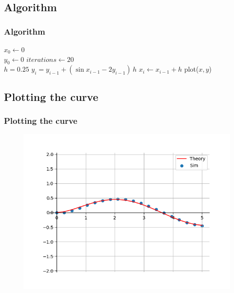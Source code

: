 \documentclass{beamer}
\providecommand{\brak}[1]{\ensuremath{\left(#1\right)}}
\theoremstyle{remark}
\numberwithin{equation}{section}
\begin{document}
\subsection{Algorithm}
\begin{frame}
    \frametitle{Algorithm}
        \begin{algorithmic}
            \STATE {} $x_0 \gets 0$\\
            \STATE $y_0 \gets 0$
            \STATE {} $iterations \gets 20$\\
            \STATE {} $h = 0.25$
                \STATE $\displaystyle y_{i} = y_{i-1} + \brak{\sin{x_{i-1}} - 2y_{i-1}}\, h$
                \STATE $x_i \gets x_{i-1} + h$
            \ENDFOR
            \STATE plot($x, y$)
        \end{algorithmic}
\end{frame}

\subsection{Plotting the curve}
\begin{frame}
\frametitle{Plotting the curve}
\begin{figure}[h]
    \includegraphics[scale=0.6]{../figs/fig1_.png}
\centering
\end{figure}
\end{frame}
\end{document}
